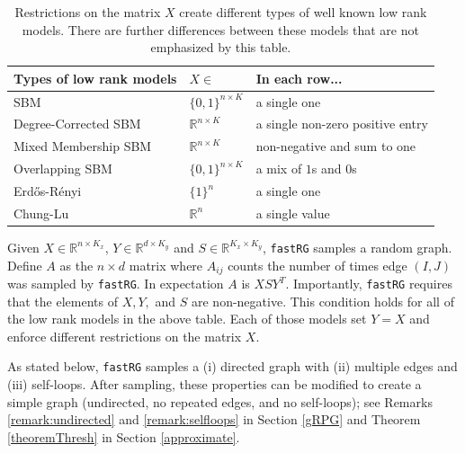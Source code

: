 \documentclass[twoside,11pt]{article}
\begin{document}
\begin{table}[htbp]
   \centering
\begin{tabular}{|l|l|l|}
\hline Types of low rank models & $X \in$  & In each row...\\
\hline SBM & $\{0,1\}^{n\times K}$ & a single one  \\
Degree-Corrected SBM & $\mathds{R}^{n \times K}$ & a single non-zero positive entry \\
Mixed Membership SBM & $\mathds{R}^{n\times K}$ & non-negative and sum to one \\
Overlapping SBM & $\{0,1\}^{n \times K}$ & a mix of $1$s and $0$s \\
Erd\H{o}s-R\'enyi  & $\{1\}^n$ &  a single one\\
Chung-Lu  & $\mathds{R}^n$ &  a single value\\
\hline \end{tabular}
   \caption{Restrictions on the matrix $X$ create different types of well known low rank models.  
   There are further differences between these models that are not emphasized by this table.}
   \label{tab:blockmodels}
\end{table}

Given $X \in \mathds{R}^{n \times K_x}$, $Y \in \mathds{R}^{d \times K_y}$ and $S \in \mathds{R}^{K_x \times K_y}$,
 \texttt{fastRG} samples a random graph.  Define $A$ as the $n\times d$ matrix where $A_{ij}$ counts the number of times edge $(I,J)$ was sampled by \texttt{fastRG}.  In expectation $A$ is $XSY^T$.   Importantly, \texttt{fastRG} requires that the elements of $X, Y,$ and $S$ are non-negative.  This condition holds for all of the low rank models in the above table. 
Each of those models set $Y = X$ and enforce different restrictions on the matrix $X$. 



 
As stated below, \texttt{fastRG} samples a (i) directed graph with (ii) multiple edges and (iii) self-loops. After sampling, these properties can be modified to create a simple graph (undirected, no repeated edges, and no self-loops);  see Remarks \ref{remark:undirected} and \ref{remark:selfloops} in Section \ref{gRPG} and Theorem \ref{theoremThresh} in Section \ref{approximate}.  
\end{document}
